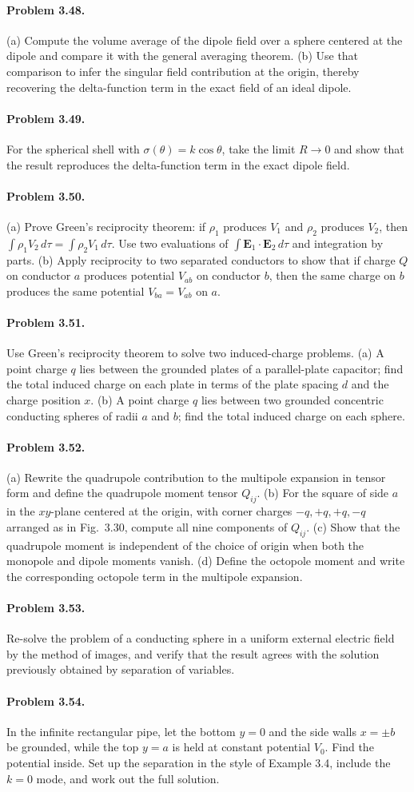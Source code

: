 \documentclass{aa}
\newcommand{\problemstatement}[2]{%
\paragraph{Problem #1.}#2\par\medskip
}
\begin{document}
\problemstatement{3.48}{(a) Compute the volume average of the dipole field over a sphere centered at the dipole and compare it with the general averaging theorem. (b) Use that comparison to infer the singular field contribution at the origin, thereby recovering the delta-function term in the exact field of an ideal dipole.}
\problemstatement{3.49}{For the spherical shell with \(\sigma(\theta)=k\cos\theta\), take the limit \(R\to 0\) and show that the result reproduces the delta-function term in the exact dipole field.}
\problemstatement{3.50}{(a) Prove Green's reciprocity theorem: if \(\rho_1\) produces \(V_1\) and \(\rho_2\) produces \(V_2\), then \(\int \rho_1 V_2\,d\tau = \int \rho_2 V_1\,d\tau\). Use two evaluations of \(\int \mathbf{E}_1\cdot\mathbf{E}_2\,d\tau\) and integration by parts. (b) Apply reciprocity to two separated conductors to show that if charge \(Q\) on conductor \(a\) produces potential \(V_{ab}\) on conductor \(b\), then the same charge on \(b\) produces the same potential \(V_{ba}=V_{ab}\) on \(a\).}
\problemstatement{3.51}{Use Green's reciprocity theorem to solve two induced-charge problems. (a) A point charge \(q\) lies between the grounded plates of a parallel-plate capacitor; find the total induced charge on each plate in terms of the plate spacing \(d\) and the charge position \(x\). (b) A point charge \(q\) lies between two grounded concentric conducting spheres of radii \(a\) and \(b\); find the total induced charge on each sphere.}
\problemstatement{3.52}{(a) Rewrite the quadrupole contribution to the multipole expansion in tensor form and define the quadrupole moment tensor \(Q_{ij}\). (b) For the square of side \(a\) in the \(xy\)-plane centered at the origin, with corner charges \(-q,+q,+q,-q\) arranged as in Fig.~3.30, compute all nine components of \(Q_{ij}\). (c) Show that the quadrupole moment is independent of the choice of origin when both the monopole and dipole moments vanish. (d) Define the octopole moment and write the corresponding octopole term in the multipole expansion.}
\problemstatement{3.53}{Re-solve the problem of a conducting sphere in a uniform external electric field by the method of images, and verify that the result agrees with the solution previously obtained by separation of variables.}
\problemstatement{3.54}{In the infinite rectangular pipe, let the bottom \(y=0\) and the side walls \(x=\pm b\) be grounded, while the top \(y=a\) is held at constant potential \(V_0\). Find the potential inside. Set up the separation in the style of Example 3.4, include the \(k=0\) mode, and work out the full solution.}
\end{document}
